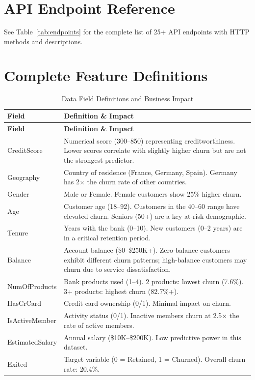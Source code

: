 \documentclass[12pt, a4paper]{report}
\begin{document}
\appendix

\chapter{API Endpoint Reference}

See Table~\ref{tab:endpoints} for the complete list of 25+ API endpoints with HTTP methods and descriptions.

\chapter{Complete Feature Definitions}

\begin{longtable}{l p{10cm}}
\caption{Data Field Definitions and Business Impact} \label{tab:fields} \\
\toprule
\textbf{Field} & \textbf{Definition \& Impact} \\
\midrule
\endfirsthead
\toprule
\textbf{Field} & \textbf{Definition \& Impact} \\
\midrule
\endhead
\bottomrule
\endfoot
CreditScore & Numerical score (300--850) representing creditworthiness. Lower scores correlate with slightly higher churn but are not the strongest predictor. \\
\midrule
Geography & Country of residence (France, Germany, Spain). Germany has 2$\times$ the churn rate of other countries. \\
\midrule
Gender & Male or Female. Female customers show 25\% higher churn. \\
\midrule
Age & Customer age (18--92). Customers in the 40--60 range have elevated churn. Seniors (50+) are a key at-risk demographic. \\
\midrule
Tenure & Years with the bank (0--10). New customers (0--2 years) are in a critical retention period. \\
\midrule
Balance & Account balance (\$0--\$250K+). Zero-balance customers exhibit different churn patterns; high-balance customers may churn due to service dissatisfaction. \\
\midrule
NumOfProducts & Bank products used (1--4). 2 products: lowest churn (7.6\%). 3+ products: highest churn (82.7\%+). \\
\midrule
HasCrCard & Credit card ownership (0/1). Minimal impact on churn. \\
\midrule
IsActiveMember & Activity status (0/1). Inactive members churn at 2.5$\times$ the rate of active members. \\
\midrule
EstimatedSalary & Annual salary (\$10K--\$200K). Low predictive power in this dataset. \\
\midrule
Exited & Target variable (0 = Retained, 1 = Churned). Overall churn rate: 20.4\%. \\
\end{longtable}
\end{document}
